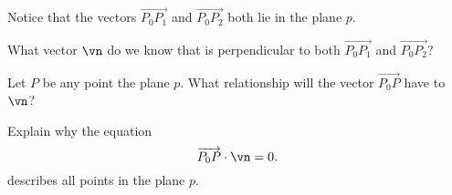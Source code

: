 \begin{activity} \label{A:9.5.6}  	Notice that the vectors $\overrightarrow{P_0P_1}$ and $\overrightarrow{P_0P_2}$ both lie in the plane $p$.
    \ba
    \item What vector $\vn$ do we know that is perpendicular to both $\overrightarrow{P_0P_1}$ and $\overrightarrow{P_0P_2}$?



\begin{comment}

The cross product $\vn = \overrightarrow{P_0P_1} \times \overrightarrow{P_0P_2}$ is a vector perpendicular to both $\overrightarrow{P_0P_1}$ and $\overrightarrow{P_0P_2}$.

\end{comment}

    \item Let $P$ be any point the plane $p$. What relationship will the vector $\overrightarrow{P_0P}$ have to $\vn$?



\begin{comment}

In fact, if $P$ is any point in the plane $p$, then the vector $\overrightarrow{P_0P}$ is orthogonal to $\vn$.

\end{comment}

    \item Explain why the equation
\begin{equation}
\overrightarrow{P_0P} \cdot \vn = 0. \label{eq:9.5.plane_vect}
\end{equation}
describes all points in the plane $p$.



    \ea


\end{activity}
\begin{smallhint}

\end{smallhint}
\begin{bighint}

\end{bighint}
\begin{activitySolution}

\end{activitySolution}
\aftera
